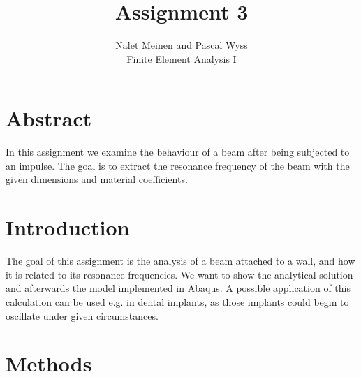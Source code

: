 \documentclass[12pt]{article}
\begin{document}


\title{Assignment 3}%
\author{Nalet Meinen and Pascal Wyss\\ %
Finite Element Analysis I
}

\maketitle
\pagebreak



\section*{Abstract}
In this assignment we examine the behaviour of a beam after being subjected to an impulse.
The goal is to extract the resonance frequency of the beam with the given dimensions and material coefficients.



\tableofcontents
\pagebreak
\section{Introduction}
The goal of this assignment is the analysis of a beam attached to a wall, 
and how it is related to its resonance frequencies. We want to show the analytical 
solution and afterwards the model implemented in Abaqus. A possible application
of this calculation can be used e.g. in dental implants, 
as those implants could begin to oscillate under given circumstances.


\section{Methods}
\end{document}

